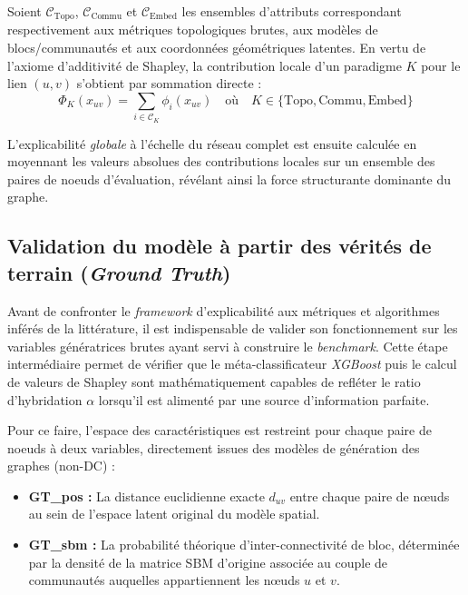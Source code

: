 Soient $\mathcal{C}_{\text{Topo}}$, $\mathcal{C}_{\text{Commu}}$ et $\mathcal{C}_{\text{Embed}}$ les ensembles d'attributs correspondant respectivement aux métriques topologiques brutes, aux modèles de blocs/communautés et aux coordonnées géométriques latentes. En vertu de l'axiome d'additivité de Shapley, la contribution locale d'un paradigme $K$ pour le lien $(u,v)$ s'obtient par sommation directe :
\begin{equation}
    \Phi_K(x_{uv}) = \sum_{i \in \mathcal{C}_K} \phi_i(x_{uv}) \quad \text{où} \quad K \in \{\text{Topo}, \text{Commu}, \text{Embed}\}
\end{equation}

L'explicabilité \textit{globale} à l'échelle du réseau complet est ensuite calculée en moyennant les valeurs absolues des contributions locales sur un ensemble des paires de noeuds d'évaluation, révélant ainsi la force structurante dominante du graphe.

\subsection{Validation du modèle à partir des vérités de terrain (\textit{Ground Truth})}
\label{sec:validation_gt}

Avant de confronter le \textit{framework} d'explicabilité aux métriques et algorithmes inférés de la littérature, il est indispensable de valider son fonctionnement sur les variables génératrices brutes ayant servi à construire le \textit{benchmark}. Cette étape intermédiaire permet de vérifier que le méta-classificateur \textit{XGBoost} puis le calcul de valeurs de Shapley sont mathématiquement capables de refléter le ratio d'hybridation $\alpha$ lorsqu'il est alimenté par une source d'information parfaite.

Pour ce faire, l'espace des caractéristiques est restreint pour chaque paire de noeuds à deux variables, directement issues des modèles de génération des graphes (non-DC) :
\begin{itemize}
    \item \textbf{GT\_pos :} La distance euclidienne exacte $d_{uv}$ entre chaque paire de nœuds au sein de l'espace latent original du modèle spatial.
    \item \textbf{GT\_sbm :} La probabilité théorique d'inter-connectivité de bloc, déterminée par la densité de la matrice SBM d'origine associée au couple de communautés auquelles appartiennent les nœuds $u$ et $v$.
\end{itemize}

